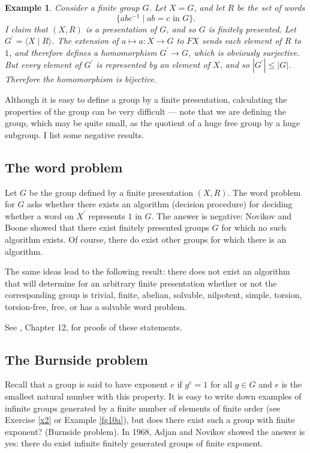 \documentclass[a4paper,11pt,final]{memoir}%
\newtheorem{example}[X]{Example}
\theoremstyle{nonumberplain}
\begin{document}
\begin{example}
\label{fg11} Consider a finite group $G$. Let $X=G$, and let $R$ be the set of
words
\[
\{abc^{-1}\mid ab=c\text{ in }G\}.
\]
I claim that $(X,R)$ is a presentation of $G$, and so $G$ is finitely
presented. Let $G^{\prime}=\langle X\mid R\rangle$. The extension of $a\mapsto
a\colon X\rightarrow G$ to $FX$ sends each element of $R$ to $1$, and
therefore defines a homomorphism $G^{\prime}\rightarrow G$, which is obviously
surjective. But every element of $G^{\prime}$ is represented by an element of
$X$, and so $|G^{\prime}|\leq|G|$. Therefore the homomorphism is bijective.
\end{example}

Although it is easy to define a group by a finite presentation, calculating
the properties of the group can be very difficult --- note that we are
defining the group, which may be quite small, as the quotient of a huge free
group by a huge subgroup. I list some negative results.

\subsection{The word problem%
%
}

Let $G$ be the group defined by a finite presentation $(X,R)$. The word
problem for $G$ asks whether there exists an algorithm (decision procedure)
for deciding whether a word on $X^{\prime}$ represents $1$ in $G$. The answer
is negative: Novikov and Boone showed that there exist finitely presented
groups $G$ for which no such algorithm exists. Of course, there do exist other
groups for which there is an algorithm.

The same ideas lead to the following result: there does not exist an algorithm
that will determine for an arbitrary finite presentation whether or not the
corresponding group is trivial, finite, abelian, solvable, nilpotent, simple,
torsion, torsion-free, free, or has a solvable word problem.

See \cite{rotman1995}, Chapter 12, for proofs of these statements.

\subsection{The Burnside problem}%

%
\label{burnside}

Recall that a group is said to have exponent%
$e$ if $g^{e}=1$ for all $g\in G$ and $e$ is the smallest natural number with
this property. It is easy to write down examples of infinite groups generated
by a finite number of elements of finite order (see Exercise \ref{x2} or
Example \ref{fg10a}), but does there exist such a group with finite exponent?
(Burnside problem). In 1968, Adjan and Novikov showed the answer is yes: there
do exist infinite finitely generated groups of finite exponent.
\end{document}
